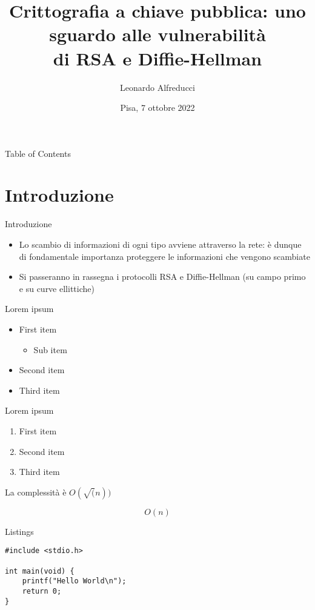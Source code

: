 \documentclass[11pt,svgnames,smaller,aspectratio=169]{beamer}
\title{Crittografia a chiave pubblica: uno sguardo alle vulnerabilità \\ di RSA e Diffie-Hellman}
\author{Leonardo Alfreducci}
\institute[Università di Pisa]{Università di Pisa\\Dipartimento di Informatica}
\date{Pisa, 7 ottobre 2022}
\begin{document}
\begin{frame} 
	\titlepage
\end{frame}



\begin{frame}{Table of Contents}
	\tableofcontents
\end{frame}

\section{Introduzione}
\begin{frame}
	\sectionpage
	\centering
\end{frame}

\begin{frame}{Introduzione}
	\begin{itemize}
		\item Lo scambio di informazioni di ogni tipo avviene attraverso la rete: è dunque di fondamentale importanza proteggere le informazioni che vengono scambiate
		\item Si passeranno in rassegna i protocolli RSA e Diffie-Hellman (su campo primo e su curve ellittiche) 
	\end{itemize}
\end{frame}

\begin{frame}{Lorem ipsum}
	\begin{itemize}
		\item First item
			\begin{itemize}
				\item Sub item
			\end{itemize}
		\item Second item
		\item Third item
	\end{itemize}
\end{frame}

\begin{frame}{Lorem ipsum}
	\begin{enumerate}
		\item First item
		\item Second item
		\item Third item
	\end{enumerate}
	La complessità è $O(\sqrt(n))$
	
	\begin{equation}
	O(n)
	\end{equation}
\end{frame}

\begin{frame}[fragile]{Listings}
	\begin{lstlisting}
#include <stdio.h>

int main(void) {
	printf("Hello World\n");
	return 0;
}
	\end{lstlisting}
\end{frame}
\end{document}
